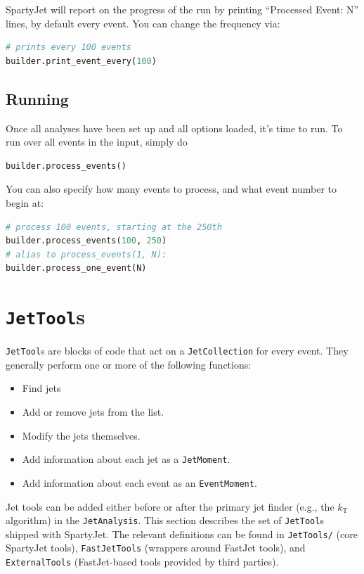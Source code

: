 \documentclass{article}
\newcommand{\prog}[1]{{\sc #1}\xspace}
\newcommand{\code}[1]{{\tt #1}\xspace}
\newcommand{\codes}[1]{{\tt #1}s\xspace}
\newcommand{\SJ}[0]{\prog{SpartyJet}}
\newcommand{\FJ}[0]{\prog{FastJet}}
\begin{document}
\SJ will report on the progress of the run by printing ``Processed Event: N'' lines, by default every event.  You can change the frequency via:
\begin{lstlisting}[language=Python]
# prints every 100 events
builder.print_event_every(100)
\end{lstlisting}

\subsection{Running}

Once all analyses have been set up and all options loaded, it's time to run.  To run over all events in the input, simply do
\begin{lstlisting}[language=Python]
builder.process_events()
\end{lstlisting}
You can also specify how many events to process, and what event number to begin at:
\begin{lstlisting}[language=Python]
# process 100 events, starting at the 250th
builder.process_events(100, 250)
# alias to process_events(1, N):
builder.process_one_event(N)
\end{lstlisting}


\section{\codes{JetTool}}
\label{f0:JetTools}

\codes{JetTool} are blocks of code that act on a \code{JetCollection} for every event.  They generally perform one or more of the following functions:
\begin{itemize}
\item Find jets
\item Add or remove jets from the list.
\item Modify the jets themselves.
\item Add information about each jet as a \code{JetMoment}.
\item Add information about each event as an \code{EventMoment}.
\end{itemize}
Jet tools can be added either before or after the primary jet finder (e.g., the $k_\text{T}$ algorithm) in the \code{JetAnalysis}.
This section describes the set of \codes{JetTool} shipped with \SJ.  The relevant definitions can be found in \verb+JetTools/+ (core \SJ tools), \verb+FastJetTools+ (wrappers around \FJ tools), and \verb+ExternalTools+ (\FJ-based tools provided by third parties).
\end{document}
